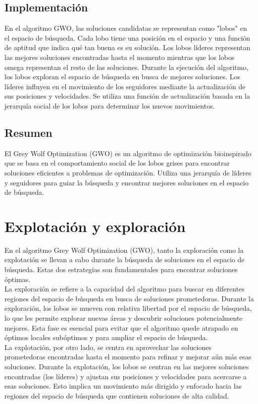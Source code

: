 \documentclass[12pt, spanish]{article}
\begin{document}
\subsection{Implementación}
En el algoritmo GWO, las soluciones candidatas se representan como "lobos" en el espacio de 
búsqueda. Cada lobo tiene una posición en el espacio y una función de aptitud que indica 
qué tan buena es su solución. Los lobos líderes representan las mejores soluciones 
encontradas hasta el momento mientras que los lobos omega representan el resto de las 
soluciones. 
\newline
Durante la ejecución del algoritmo, los lobos exploran el espacio de búsqueda en busca de 
mejores soluciones. Los líderes influyen en el movimiento de los seguidores mediante la 
actualización de sus posiciones y velocidades. Se utiliza una función de actualización basada 
en la jerarquía social de los lobos para determinar los nuevos movimientos.

\subsection{Resumen}
El Grey Wolf Optimization (GWO) es un algoritmo de optimización bioinspirado que se 
basa en el comportamiento social de los lobos grises para encontrar soluciones eficientes a 
problemas de optimización. Utiliza una jerarquía de líderes y seguidores para guiar la búsqueda 
y encontrar mejores soluciones en el espacio de búsqueda.

\section{Explotación y exploración}
En el algoritmo Grey Wolf Optimization (GWO), tanto la exploración como la explotación se 
llevan a cabo durante la búsqueda de soluciones en el espacio de búsqueda. Estas dos 
estrategias son fundamentales para encontrar soluciones óptimas.\\
\newline
La exploración se refiere a la capacidad del algoritmo para buscar en diferentes regiones 
del espacio de búsqueda en busca de soluciones prometedoras. Durante la exploración, los 
lobos se mueven con relativa libertad por el espacio de búsqueda, lo que les permite explorar nuevas 
áreas y descubrir soluciones potencialmente mejores. Esta fase es esencial para evitar que el 
algoritmo quede atrapado en óptimos locales subóptimos y para ampliar el espacio de búsqueda.\\
\newline
La explotación, por otro lado, se centra en aprovechar las soluciones prometedoras encontradas 
hasta el momento para refinar y mejorar aún más esas soluciones. Durante la explotación, los 
lobos se centran en las mejores soluciones encontradas (los líderes) y ajustan sus posiciones y 
velocidades para acercarse a esas soluciones. Esto implica un movimiento más dirigido y enfocado 
hacia las regiones del espacio de búsqueda que contienen soluciones de alta calidad.
\end{document}
